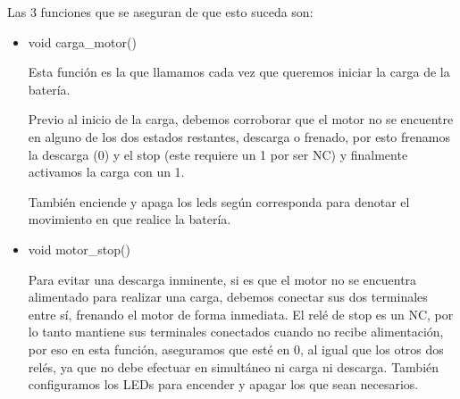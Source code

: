                 Las 3 funciones que se aseguran de que esto suceda son:\par
                
                \begin{itemize} [label = ·]
                \setlength{\itemindent}{1.5em}
                
                    \item void carga\_motor()\par
                        Esta función es la que llamamos cada vez que queremos iniciar la carga de la batería.\par
                        Previo al inicio de la carga, debemos corroborar que el motor no se encuentre en alguno de los dos estados restantes, descarga o frenado, por esto frenamos la descarga (0) y el stop (este requiere un 1 por ser NC) y finalmente activamos la carga con un 1.\par
                        También enciende y apaga los leds según corresponda para denotar el movimiento en que realice la batería.\par
                        
                \end{itemize}

                \begin{itemize} [label = ·]
                \setlength{\itemindent}{1.5em}
                
                    \item void motor\_stop()\par
                        Para evitar una descarga inminente, si es que el motor no se encuentra alimentado para realizar una carga, debemos conectar sus dos terminales entre sí, frenando el motor de forma inmediata. El relé de stop es un NC, por lo tanto mantiene sus terminales conectados cuando no recibe alimentación, por eso en esta función, aseguramos que esté en 0, al igual que los otros dos relés, ya que no debe efectuar en simultáneo ni carga ni descarga.
                        También configuramos los LEDs para encender y apagar los que sean necesarios.
                \end{itemize}


